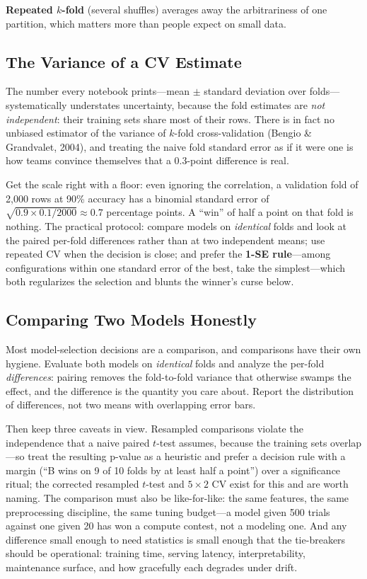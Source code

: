 \textbf{Repeated $k$-fold} (several shuffles) averages away the arbitrariness of one partition, which matters more than people expect on small data.

\subsection{The Variance of a CV Estimate}

The number every notebook prints---mean $\pm$ standard deviation over folds---systematically understates uncertainty, because the fold estimates are \emph{not independent}: their training sets share most of their rows. There is in fact no unbiased estimator of the variance of $k$-fold cross-validation (Bengio \& Grandvalet, 2004), and treating the naive fold standard error as if it were one is how teams convince themselves that a 0.3-point difference is real.

Get the scale right with a floor: even ignoring the correlation, a validation fold of 2{,}000 rows at 90\% accuracy has a binomial standard error of $\sqrt{0.9 \times 0.1/2000} \approx 0.7$ percentage points. A ``win'' of half a point on that fold is nothing. The practical protocol: compare models on \emph{identical} folds and look at the paired per-fold differences rather than at two independent means; use repeated CV when the decision is close; and prefer the \textbf{1-SE rule}---among configurations within one standard error of the best, take the simplest---which both regularizes the selection and blunts the winner's curse below.

\subsection{Comparing Two Models Honestly}

Most model-selection decisions are a comparison, and comparisons have their own hygiene. Evaluate both models on \emph{identical} folds and analyze the per-fold \emph{differences}: pairing removes the fold-to-fold variance that otherwise swamps the effect, and the difference is the quantity you care about. Report the distribution of differences, not two means with overlapping error bars.

Then keep three caveats in view. Resampled comparisons violate the independence that a naive paired $t$-test assumes, because the training sets overlap---so treat the resulting p-value as a heuristic and prefer a decision rule with a margin (``B wins on 9 of 10 folds by at least half a point'') over a significance ritual; the corrected resampled $t$-test and $5\times2$ CV exist for this and are worth naming. The comparison must also be like-for-like: the same features, the same preprocessing discipline, the same tuning budget---a model given 500 trials against one given 20 has won a compute contest, not a modeling one. And any difference small enough to need statistics is small enough that the tie-breakers should be operational: training time, serving latency, interpretability, maintenance surface, and how gracefully each degrades under drift.

